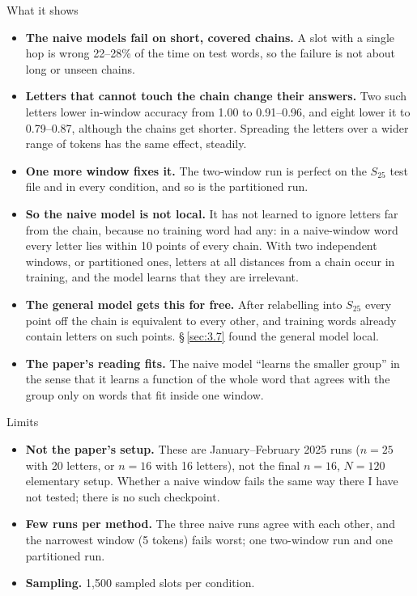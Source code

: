 \documentclass[paper=a4,fontsize=11pt,DIV=11,parskip=half,headings=small,numbers=noendperiod]{scrartcl}
\DeclareRobustCommand{\lead}[1]{\textsf{\bfseries\color{accent}#1}}
\begin{document}
\begin{findbox}{What it shows}
\begin{itemize}
\item \lead{The naive models fail on short, covered chains.} A slot with a single hop is wrong 22–28\% of the
  time on test words, so the failure is not about long or unseen chains.
\item \lead{Letters that cannot touch the chain change their answers.} Two such letters lower in-window accuracy
  from 1.00 to 0.91–0.96, and eight lower it to 0.79–0.87, although the chains get shorter. Spreading the
  letters over a wider range of tokens has the same effect, steadily.
\item \lead{One more window fixes it.} The two-window run is perfect on the $S_{25}$ test file and in every
  condition, and so is the partitioned run.
\item \lead{So the naive model is not local.} It has not learned to ignore letters far from the chain, because
  no training word had any: in a naive-window word every letter lies within 10 points of every chain. With two
  independent windows, or partitioned ones, letters at all distances from a chain occur in training, and the
  model learns that they are irrelevant.
\item \lead{The general model gets this for free.} After relabelling into $S_{25}$ every point off the chain is
  equivalent to every other, and training words already contain letters on such points. \S\,\ref{sec:3.7} found
  the general model local.
\item \lead{The paper’s reading fits.} The naive model “learns the smaller group” in the sense that it learns a
  function of the whole word that agrees with the group only on words that fit inside one window.
\end{itemize}
\end{findbox}

\begin{limbox}{Limits}
\begin{itemize}
\item \lead{Not the paper’s setup.} These are January–February 2025 runs ($n=25$ with 20 letters, or $n=16$ with
  16 letters), not the final $n=16$, $N=120$ elementary setup. Whether a naive window fails the same way there I
  have not tested; there is no such checkpoint.
\item \lead{Few runs per method.} The three naive runs agree with each other, and the narrowest window (5
  tokens) fails worst; one two-window run and one partitioned run.
\item \lead{Sampling.} 1,500 sampled slots per condition.
\end{itemize}
\end{limbox}
\end{document}
